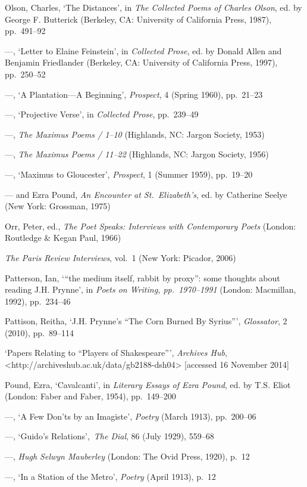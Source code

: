 \documentclass[]{article}
\begin{document}
Olson, Charles, ‘The Distances’, in \emph{The Collected Poems of Charles
Olson}, ed. by George F. Butterick (Berkeley, CA: University of
California Press, 1987), pp.~491–92

—, ‘Letter to Elaine Feinstein’, in \emph{Collected Prose}, ed. by
Donald Allen and Benjamin Friedlander (Berkeley, CA: University of
California Press, 1997), pp.~250–52

—, ‘A Plantation—A Beginning’, \emph{Prospect}, 4 (Spring 1960),
pp.~21–23

—, ‘Projective Verse’, in \emph{Collected Prose}, pp.~239–49

—, \emph{The Maximus Poems / 1–10} (Highlands, NC: Jargon Society, 1953)

—, \emph{The Maximus Poems / 11–22} (Highlands, NC: Jargon Society,
1956)

—, ‘Maximus to Gloucester’, \emph{Prospect}, 1 (Summer 1959), pp.~19–20

— and Ezra Pound, \emph{An Encounter at St.~Elizabeth’s}, ed. by
Catherine Seelye (New York: Grossman, 1975)

Orr, Peter, ed., \emph{The Poet Speaks: Interviews with Contemporary
Poets} (London: Routledge \& Kegan Paul, 1966)

\emph{The Paris Review Interviews}, vol.~1 (New York: Picador, 2006)

Patterson, Ian, ‘“the medium itself, rabbit by proxy”: some thoughts
about reading J.H. Prynne’, in \emph{Poets on Writing, pp.~1970–1991}
(London: Macmillan, 1992), pp.~234–46

Pattison, Reitha, ‘J.H. Prynne’s “The Corn Burned By Syrius”’,
\emph{Glossator}, 2 (2010), pp.~89–114

‘Papers Relating to “Players of Shakespeare”’, \emph{Archives Hub},\\
\textless{}http://archiveshub.ac.uk/data/gb2188-dsh04\textgreater{}
{[}accessed 16 November 2014{]}

Pound, Ezra, ‘Cavalcanti’, in \emph{Literary Essays of Ezra Pound}, ed.
by T.S. Eliot (London: Faber and Faber, 1954), pp.~149–200

—, ‘A Few Don’ts by an Imagiste’, \emph{Poetry} (March 1913), pp.~200–06

—, ‘Guido’s Relations’,~\emph{The Dial}, 86 (July 1929), 559–68

—, \emph{Hugh Selwyn Mauberley} (London: The Ovid Press, 1920), p.~12

—, ‘In a Station of the Metro’, \emph{Poetry} (April 1913), p.~12
\end{document}

